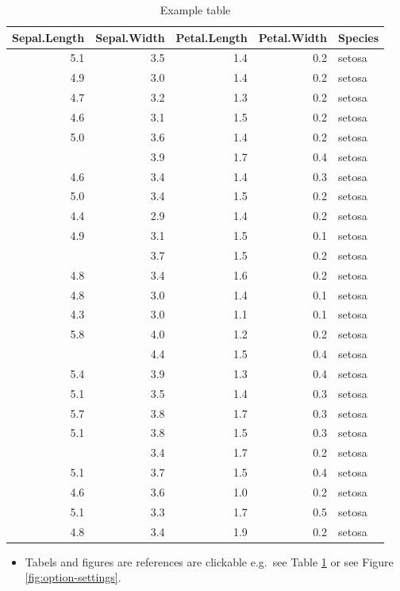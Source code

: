 \documentclass[]{book}
\providecommand{\tightlist}{%
  \setlength{\itemsep}{0pt}\setlength{\parskip}{0pt}}
\theoremstyle{definition}
\theoremstyle{definition}
\theoremstyle{definition}
\theoremstyle{remark}
\begin{document}
\begin{longtable}[t]{rrrrl}
\caption{\label{tab:nice-tab}Example table}\\
\toprule
Sepal.Length & Sepal.Width & Petal.Length & Petal.Width & Species\\
\midrule
5.1 & 3.5 & 1.4 & 0.2 & setosa\\
4.9 & 3.0 & 1.4 & 0.2 & setosa\\
4.7 & 3.2 & 1.3 & 0.2 & setosa\\
4.6 & 3.1 & 1.5 & 0.2 & setosa\\
5.0 & 3.6 & 1.4 & 0.2 & setosa\\
\addlinespace
5.4 & 3.9 & 1.7 & 0.4 & setosa\\
4.6 & 3.4 & 1.4 & 0.3 & setosa\\
5.0 & 3.4 & 1.5 & 0.2 & setosa\\
4.4 & 2.9 & 1.4 & 0.2 & setosa\\
4.9 & 3.1 & 1.5 & 0.1 & setosa\\
\addlinespace
5.4 & 3.7 & 1.5 & 0.2 & setosa\\
4.8 & 3.4 & 1.6 & 0.2 & setosa\\
4.8 & 3.0 & 1.4 & 0.1 & setosa\\
4.3 & 3.0 & 1.1 & 0.1 & setosa\\
5.8 & 4.0 & 1.2 & 0.2 & setosa\\
\addlinespace
5.7 & 4.4 & 1.5 & 0.4 & setosa\\
5.4 & 3.9 & 1.3 & 0.4 & setosa\\
5.1 & 3.5 & 1.4 & 0.3 & setosa\\
5.7 & 3.8 & 1.7 & 0.3 & setosa\\
5.1 & 3.8 & 1.5 & 0.3 & setosa\\
\addlinespace
5.4 & 3.4 & 1.7 & 0.2 & setosa\\
5.1 & 3.7 & 1.5 & 0.4 & setosa\\
4.6 & 3.6 & 1.0 & 0.2 & setosa\\
5.1 & 3.3 & 1.7 & 0.5 & setosa\\
4.8 & 3.4 & 1.9 & 0.2 & setosa\\
\bottomrule
\end{longtable}

\begin{itemize}
\tightlist
\item
  Tabels and figures are references are clickable e.g.~see Table
  \ref{tab:nice-tab} or see Figure \ref{fig:option-settings}.
\end{itemize}
\end{document}
